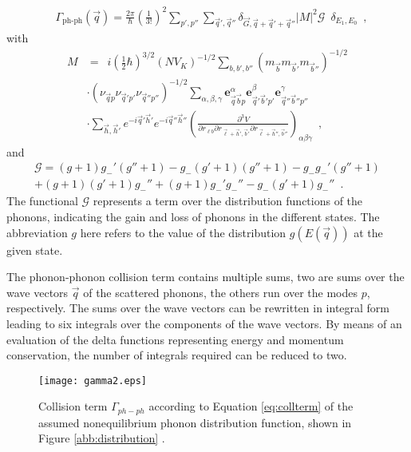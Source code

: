 \documentclass[ aps, prb, reprint, groupedaddress]{revtex4-1}
\begin{document}
 \begin{align}
	&\Gamma_{\text{ph-ph}}(\vec{q}) = \frac{2 \pi}{\hbar} \left( \frac{1}{3!} \right)^2 \sum_{p',p''} \sum_{\vec{q}',\vec{q}''} \delta_{\vec{G},\vec{q}+\vec{q}'+\vec{q}''}  | M |^2  \mathcal G 
      \enspace \delta_{E_1, E_0}  \enspace ,
      \label{eq:collterm}
\end{align}
with
\begin{align}
	M &=  \enspace i \left( \frac{1}{2} \hbar \right)^{3/2} (NV_K)^{-1/2}    
  \sum_{b,b',b''} (m_{\vec{b}} m_{\vec{b}'} m_{\vec{b}''})^{-1/2}  
 \nonumber     \\ & \cdot {(\nu_{\vec{q}p} \nu_{\vec{q}'p'} \nu_{\vec{q}''p''})^{-1/2}} 
    \sum_{\alpha, \beta, \gamma} {{{\textbf{e}}_{\vec{q}\vec{b}p}^{\alpha} {\textbf{e}}_{\vec{q}'\vec{b}'p'}^{\beta} {\textbf{e}}_{\vec{q}''\vec{b}''p''}^{\gamma}}} 
 \nonumber     \\ & \cdot \sum_{\vec{h},\vec{h}'} e^{-i\vec{q}'\vec{h}'}e^{-i\vec{q}''\vec{h}''} { \left( \frac{\partial^3 V}{\partial r_{\ell b} \partial r_{\vec{\ell}+\vec{h}',\vec{b}'} \partial r_{\vec{\ell}+\vec{h}'', \vec{b}''}} \right)_{ \alpha \beta \gamma}} \enspace ,
\end{align}
and 
\begin{align}
\mathcal G=(g+1)g_{-}'(g''+1)-g_{-}(g'+1)(g''+1)-g_{-}g_{-}'(g''+1) 
\nonumber \\+(g+1)(g'+1)g_{-}''+(g+1)g_{-}'g_{-}''-g_{-}(g'+1)g_{-}'' \enspace .
\end{align}
The functional $\mathcal G$ represents a term over the distribution functions of the phonons, indicating the gain and loss of phonons in the different states. The abbreviation $g$ here refers to the value of the 
distribution $g(E(\vec q))$ at the given state.


The phonon-phonon collision term contains multiple sums, two are sums over the wave vectors $\vec q$ of the scattered phonons, the others run over the modes $p$, respectively.
The sums over the wave vectors can be rewritten in integral form leading to six integrals over the components of the wave vectors.
By means of an evaluation of the delta functions representing energy and momentum conservation, the number of integrals required can be reduced to two.

% 
 \begin{figure}[!h]


\texttt{[image: gamma2.eps]} %

\caption{Collision term $\Gamma_{ph-ph}$ according to Equation \eqref{eq:collterm} of the assumed nonequilibrium phonon distribution function, shown in Figure \ref{abb:distribution} .}
\label{abb:gamma}
\end{figure}
\end{document}
